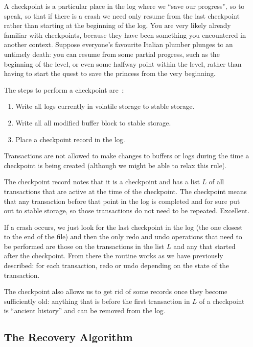 \documentclass[a4paper]{report}
\begin{document}
A checkpoint is a particular place in the log where we ``save our progress'', so to speak, so that if there is a crash we need only resume from the last checkpoint rather than starting at the beginning of the log. You are very likely already familiar with checkpoints, because they have been something you encountered in another context. Suppose everyone's favourite Italian plumber plunges to an untimely death: you can resume from some partial progress, such as the beginning of the level, or even some halfway point within the level, rather than having to start the quest to save the princess from the very beginning. 

The steps to perform a checkpoint are~\cite{dsc}:

\begin{enumerate}
	\item Write all logs currently in volatile storage to stable storage.
	\item Write all all modified buffer block to stable storage.
	\item Place a checkpoint record in the log.
\end{enumerate}

Transactions are not allowed to make changes to buffers or logs during the time a checkpoint is being created (although we might be able to relax this rule).

The checkpoint record notes that it is a checkpoint and has a list $L$ of all transactions that are active at the time of the checkpoint. The checkpoint means that any transaction before that point in the log is completed and for sure put out to stable storage, so those transactions do not need to be repeated. Excellent.

If a crash occurs, we just look for the last checkpoint in the log (the one closest to the end of the file) and then the only redo and undo operations that need to be performed are those on the transactions in the list $L$ and any that started after the checkpoint. From there the routine works as we have previously described: for each transaction, redo or undo depending on the state of the transaction.

The checkpoint also allows us to get rid of some records once they become sufficiently old: anything that is before the first transaction in $L$ of a checkpoint is ``ancient history'' and can be removed from the log.

\subsection*{The Recovery Algorithm}
\end{document}
